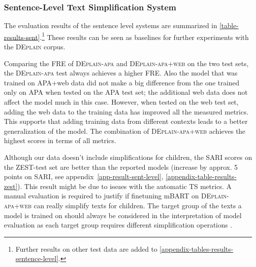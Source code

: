 \documentclass[11pt]{article}
\begin{document}
\subsubsection{Sentence-Level Text Simplification System}
The evaluation results of the sentence level systems are summarized in \autoref{table-results-sent}.\footnote{Further results on other test data are added to  \autoref{appendix-tables-results-sentence-level}.} 
These results can be seen as baselines for further experiments with the \textsc{DEplain} corpus. \par
Comparing the FRE of \textsc{DEplain-apa} and \textsc{DEplain-apa+web} on the two test sets, the \textsc{DEplain-apa} test always achieves a higher FRE. 
Also the model that was trained on APA+web data did not make a big difference from the one trained only on APA when tested on the APA test set; the additional web data does not affect the model much in this case. However, when tested on the web test set, adding the web data to the training data has improved all the measured metrics. This supports that adding training data from different contexts leads to a better generalization of the model.
The combination of \textsc{DEplain-apa+web} achieves the highest scores in terms of all metrics. \par

Although our data doesn't include simplifications for children, the SARI scores on the ZEST-test set are better than the reported models (increase by approx.  5 points on SARI, see appendix~\ref{app-result-sent-level}, \autoref{appendix-table-results-zest}). This result might be due to issues with the automatic TS metrics. A manual evaluation is required to justify if finetuning mBART on \textsc{DEplain-apa+web} can really simplify texts for children. The target group of the texts a model is trained on should always be considered in the interpretation of model evaluation as each target group requires different simplification operations \cite{gooding-2022-ethical}.
\end{document}

